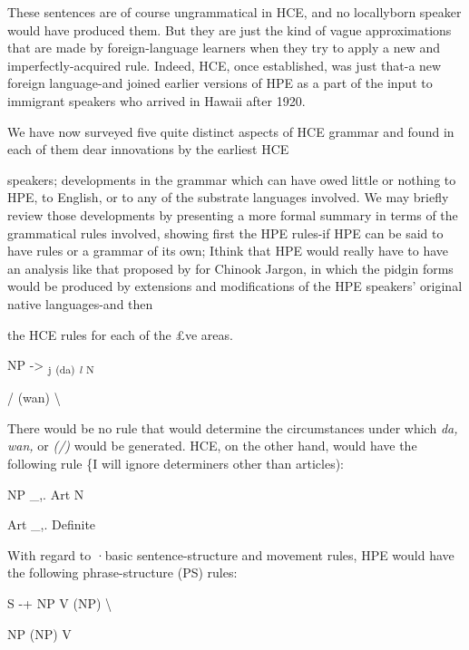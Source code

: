 These sentences are of course ungrammatical in HCE, and no locally\-born speaker would have produced them. But they are just the kind of vague approximations that are made by foreign-language learners when they try to apply a new and imperfectly-acquired rule. Indeed, HCE, once established, was just that-a new foreign language-and joined earlier versions of HPE as a part of the input to immigrant speakers who arrived in Hawaii after 1920.

We have now surveyed five quite distinct aspects of HCE gram\-mar and found in each of them dear innovations by the earliest HCE


speakers; developments in the grammar which can have owed little or nothing to HPE, to English, or to any of the substrate languages involved. We may briefly review those developments by presenting a more formal summary in terms of the grammatical rules involved, showing first the HPE rules-if HPE can be said to have rules or a grammar of its own; Ithink that HPE would really have to have an analysis like that proposed by \citet{Silverstein1972} for Chinook Jargon, in which the pidgin forms would be produced by extensions and modifications of the HPE speakers' original native languages-and then

the HCE rules for each of the £ve areas.


\ea\label{ex:91}
NP {}-{\textgreater} \textsubscript{j}\textsubscript{ }\textsubscript{(da) }\textit{\textsubscript{l}}\textsubscript{ }\textsubscript{N}
\glt
\z

/ (wan) {\textbackslash}

There would be no rule that would determine the circumstances under which \textit{da,} \textit{wan,} or \textit{(/)} would be generated. HCE, on the other hand, would have the following rule \{I will ignore determiners other than articles): 

\ea\label{ex:92}
NP \_,. Art N
\glt
\z

\ea\label{ex:93}
Art \_,. Definite
\glt
\z

With regard to ·basic sentence-structure and movement rules, HPE would have the following phrase-structure (PS) rules: 

\ea\label{ex:86}
S {}-+ NP V (NP) {\textbackslash}
\glt
\z

NP (NP) V

\ea\label{ex:94}

\glt
\z

